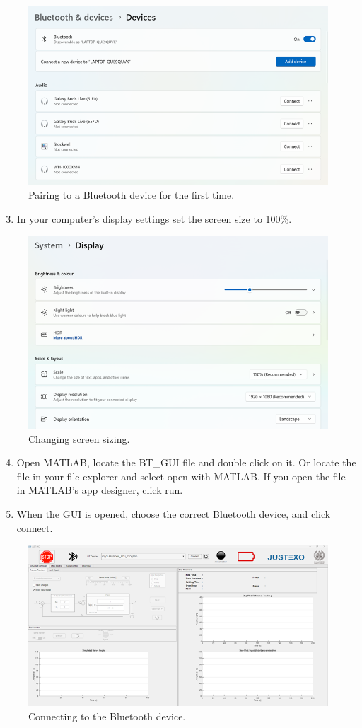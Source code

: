 \begin{figure}[H]
	\centering
	\includegraphics[width=0.7\linewidth]{img/fig_08}
	\caption{Pairing to a Bluetooth device for the first time.}
	\label{fig:fig08}
\end{figure}
\begin{enumerate}[]
	\setcounter{enumi}{2}
	\item In your computer's display settings set the screen size to 100\%.
\end{enumerate}
\begin{figure}[H]
	\centering
	\includegraphics[width=0.7\linewidth]{img/fig_09}
	\caption{Changing screen sizing.}
	\label{fig:fig09}
\end{figure}

\begin{enumerate}[]
	\setcounter{enumi}{3}
	\item Open MATLAB, locate the BT\_GUI file and double click on it. Or locate the file in your file explorer and select open with MATLAB. If you open the file in MATLAB’s app designer, click run.
	\item When the GUI is opened, choose the correct Bluetooth device, and click connect. 
\end{enumerate}

\begin{figure}[H]
	\centering
	\includegraphics[width=0.7\linewidth]{img/fig_10}
	\caption{Connecting to the Bluetooth device.}
	\label{fig:fig10}
\end{figure}

